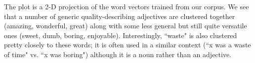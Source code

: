 \documentclass{article}
\begin{document}
The plot is a 2-D projection of the word vectors trained from our corpus. We see that a number of generic quality-describing adjectives are clustered together (amazing, wonderful, great) along with some less general but still quite versatile ones (sweet, dumb, boring, enjoyable). Interestingly, ``waste" is also clustered pretty closely to these words; it is often used in a similar context (``x was a waste of time" vs. ``x was boring") although it is a noun rather than an adjective.
\end{document}
